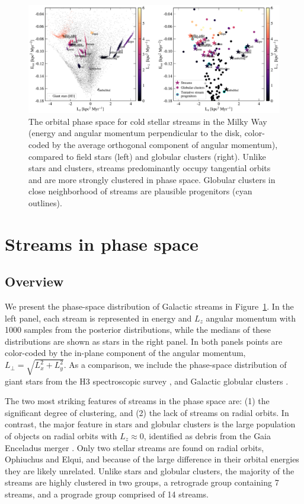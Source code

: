 \documentclass[twocolumn]{aastex63}
\begin{document}
\begin{figure}
\begin{center}
\includegraphics[width=\textwidth]{elz_streams.pdf}
\end{center}
\caption{The orbital phase space for cold stellar streams in the Milky Way (energy and angular momentum perpendicular to the disk, color-coded by the average orthogonal component of angular momentum), compared to field stars (left) and globular clusters (right).
Unlike stars and clusters, streams predominantly occupy tangential orbits and are more strongly clustered in phase space.
Globular clusters in close neighborhood of streams are plausible progenitors (cyan outlines).
}
\label{fig:elz}
\end{figure}

\section{Streams in phase space}

\subsection{Overview}
\label{sec:elz}

We present the phase-space distribution of Galactic streams in Figure~\ref{fig:elz}.
In the left panel, each stream is represented in energy and $L_z$ angular momentum with 1000 samples from the posterior distributions, while the medians of these distributions are shown as stars in the right panel.
In both panels points are color-coded by the in-plane component of the angular momentum, $L_\perp=\sqrt{L_x^2+L_y^2}$.
As a comparison, we include the phase-space distribution of giant stars from the H3 spectroscopic survey \citep[left panel, small black points;][]{conroy2019}, and Galactic globular clusters \citep[righ panel, small circles colored by $L_\perp$;][]{baumgardt2019}.

The two most striking features of streams in the phase space are: (1) the significant degree of clustering, and (2) the lack of streams on radial orbits.
In contrast, the major feature in stars and globular clusters is the large population of objects on radial orbits with $L_z\approx0$, identified as debris from the Gaia Enceladus merger \citep[e.g.,][]{belokurov2018, helmi2018, naidu2020}.
Only two stellar streams are found on radial orbits, Ophiuchus and Elqui, and because of the large difference in their orbital energies they are likely unrelated.
Unlike stars and globular clusters, the majority of the streams are highly clustered in two groups, a retrograde group containing 7 streams, and a prograde group comprised of 14 streams.
\end{document}
